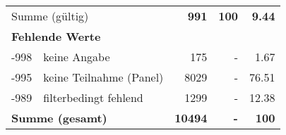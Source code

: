 \begin{longtable}{lXrrr}
     \midrule
     \multicolumn{2}{l}{Summe (gültig)} &
       \textbf{\num{991}} &
     \textbf{100} &
       \textbf{\num[round-mode=places,round-precision=2]{9,44}} \\
     \multicolumn{5}{l}{\textbf{Fehlende Werte}}\\
       -998 &
       keine Angabe &
         \num{175} &
        - &
         \num[round-mode=places,round-precision=2]{1,67} \\
       -995 &
       keine Teilnahme (Panel) &
         \num{8029} &
        - &
         \num[round-mode=places,round-precision=2]{76,51} \\
       -989 &
       filterbedingt fehlend &
         \num{1299} &
        - &
         \num[round-mode=places,round-precision=2]{12,38} \\
     \midrule
     \multicolumn{2}{l}{\textbf{Summe (gesamt)}} &
          \textbf{\num{10494}} &
        \textbf{-} &
        \textbf{100} \\
     \bottomrule
     \end{longtable}
     
